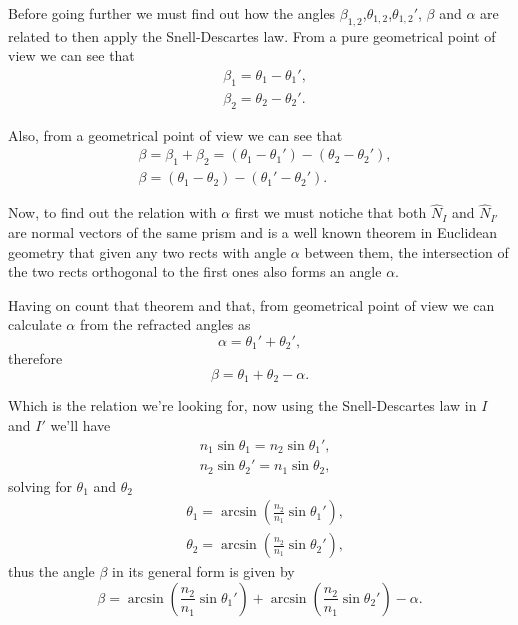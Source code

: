             Before going further we must find out how the angles $\beta_{1,2}$,$\theta_{1,2}$,$\theta_{1,2}'$, $\beta$ and $\alpha$ are related to then apply the Snell-Descartes law. From a pure geometrical point of view we can see that
            \begin{align}
                & \beta_1 = \theta_1 - \theta_1',\\
                & \beta_2 = \theta_2 - \theta_2'.
            \end{align}

            Also, from a geometrical point of view we can see that
            \begin{align}
                & \beta = \beta_1 + \beta_2 = \left( \theta_1 - \theta_1' \right) - \left(\theta_2 - \theta_2'\right),\\
                & \beta = \left(\theta_1 - \theta_2\right) - \left(\theta_1' - \theta_2'\right).
            \end{align}

            Now, to find out the relation with $\alpha$ first we must notiche that both $\hat{N}_I$ and $\hat{N}_{I'}$ are normal vectors of the same prism and is a well known theorem in Euclidean geometry that given any two rects with angle $\alpha$ between them, the intersection of the two rects orthogonal to the first ones also forms an angle $\alpha$. 

            Having on count that theorem and that, from geometrical point of view we can calculate $\alpha$ from the refracted angles as
            \begin{equation}
                \alpha = \theta_1' + \theta_2',
            \end{equation}
            therefore
            \begin{equation}
                \beta = \theta_1 + \theta_2 - \alpha.
            \end{equation}

            Which is the relation we're looking for, now using the Snell-Descartes law in $I$ and $I'$ we'll have
            \begin{align}
                & n_1\sin\theta_1 = n_2\sin\theta_1',\\
                & n_2\sin\theta_2' = n_1\sin\theta_2,
            \end{align}
            solving for $\theta_1$ and $\theta_2$
            \begin{align}
                & \theta_1 = \arcsin \left(\frac{n_2}{n_1}\sin\theta_1'\right),\\
                & \theta_2 = \arcsin \left(\frac{n_2}{n_1} \sin\theta_2'\right),
            \end{align}
            thus the angle $\beta$ in its general form is given by
            \begin{equation}\label{eq:BetaPrismGen}
                \beta = \arcsin \left(\frac{n_2}{n_1}\sin\theta_1'\right) + \arcsin \left(\frac{n_2}{n_1} \sin\theta_2'\right) - \alpha.
            \end{equation}

